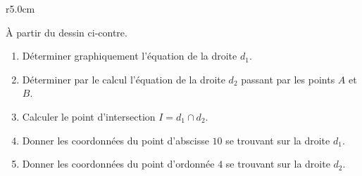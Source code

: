 
\begin{exercice}[\ldots/4]\label{exosmath-0695}

\begin{wrapfigure}{r}{5.0cm}
   \vspace{-1cm}        %
   \centering
   
\end{wrapfigure}

    À partir du dessin ci-contre.
    \begin{enumerate}
        \item
            Déterminer graphiquement l'équation de la droite \( d_1\).
        \item
            Déterminer par le calcul l'équation de la droite \( d_2\) passant par les points \( A\) et \( B\).
        \item
            Calculer le point d'intersection \( I=d_1\cap d_2\).
        \item
            Donner les coordonnées du point d'abscisse \( 10\) se trouvant sur la droite \( d_1\).
        \item
            Donner les coordonnées du point d'ordonnée \( 4\) se trouvant sur la droite \( d_2\).
    \end{enumerate}

\end{exercice}

